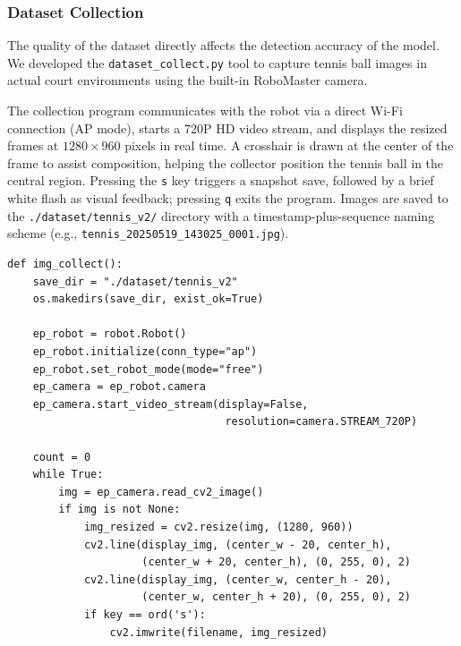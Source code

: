 
\subsubsection{Dataset Collection}
\label{sec:cv:dataset}

The quality of the dataset directly affects the detection accuracy of the model. We developed the \texttt{dataset\_collect.py} tool to capture tennis ball images in actual court environments using the built-in RoboMaster camera.

The collection program communicates with the robot via a direct Wi-Fi connection (AP mode), starts a 720P HD video stream, and displays the resized frames at $1280\times960$ pixels in real time. A crosshair is drawn at the center of the frame to assist composition, helping the collector position the tennis ball in the central region. Pressing the \texttt{s} key triggers a snapshot save, followed by a brief white flash as visual feedback; pressing \texttt{q} exits the program. Images are saved to the \texttt{./dataset/tennis\_v2/} directory with a timestamp-plus-sequence naming scheme (e.g., \texttt{tennis\_20250519\_143025\_0001.jpg}).

\begin{verbatim}
def img_collect():
    save_dir = "./dataset/tennis_v2"
    os.makedirs(save_dir, exist_ok=True)

    ep_robot = robot.Robot()
    ep_robot.initialize(conn_type="ap")
    ep_robot.set_robot_mode(mode="free")
    ep_camera = ep_robot.camera
    ep_camera.start_video_stream(display=False,
                                  resolution=camera.STREAM_720P)

    count = 0
    while True:
        img = ep_camera.read_cv2_image()
        if img is not None:
            img_resized = cv2.resize(img, (1280, 960))
            cv2.line(display_img, (center_w - 20, center_h),
                     (center_w + 20, center_h), (0, 255, 0), 2)
            cv2.line(display_img, (center_w, center_h - 20),
                     (center_w, center_h + 20), (0, 255, 0), 2)
            if key == ord('s'):
                cv2.imwrite(filename, img_resized)

\end{verbatim}


